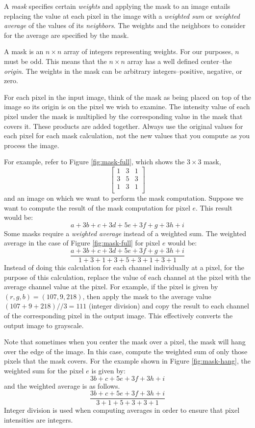 \documentclass[addpoints]{exam}
\begin{document}
A \textit{mask} specifies certain \textit{weights} and applying the mask to an image entails replacing the value at each pixel in the image with a \textit{weighted sum} or \textit{weighted average} of the values of its \textit{neighbors}. The weights and the neighbors to consider for the average are specified by the mask.

A mask is an $n \times n$ array of integers representing weights. For our purposes, $n$ must be odd. This means that the $n \times n$ array has a well defined center--the \textit{origin}. The weights in the mask can be arbitrary integers--positive, negative, or zero.

For each pixel in the input image, think of the mask as being placed on top of the image so its origin is on the pixel we wish to examine. The intensity value of each pixel under the mask is multiplied by the corresponding value in the mask that covers it. These products are added together. Always use the original values for each pixel for each mask calculation, not the new values that you compute as you process the image.

For example, refer to Figure \ref{fig:mask-full}, which shows the  $3 \times 3$ mask,
\[
  \left[
    \begin{array}{ccc}
      1 & 3 & 1 \\
      3 & 5 & 3 \\
      1 & 3 & 1 \\
    \end{array}
    \right]
\]
and an image on which we want to perform the mask computation. Suppose we want to compute the result of the mask computation for pixel $e$. This result would be:
\[
  a + 3b + c + 3d + 5e + 3f + g + 3h + i
\]
Some masks require a \textit{weighted average} instead of a weighted sum. The weighted average in the case of Figure \ref{fig:mask-full} for pixel $e$ would be:
\[
  \frac{a + 3b + c + 3d + 5e + 3f + g + 3h + i} {1 + 3 + 1 + 3 + 5 + 3 + 1 + 3 + 1}
\]
Instead of doing this calculation for each channel individually at a pixel, for the purpose of this calculation, replace the value of each channel at the pixel with the average channel value at the pixel. For example, if the pixel is given by $(r, g, b) = (107, 9, 218)$, then apply the mask to the average value $(107 + 9 + 218)//3 = 111$ (integer division) and copy the result to each channel of the corresponding pixel in the output image. This effectively converts the output image to grayscale.

Note that sometimes when you center the mask over a pixel, the mask will hang over the edge of the image. In this case, compute the weighted sum of only those pixels that the mask covers. For the example shown in Figure \ref{fig:mask-hang}, the weighted sum for the pixel $e$ is given by:
\[
  3b + c + 5e + 3f + 3h + i
\]
and the weighted average is as follows.
\[
  \frac{3b + c + 5e + 3f + 3h + i}{3+1+5+3+3+1}
\]
Integer division is used when computing averages in order to ensure that pixel intensities are integers.
\end{document}
